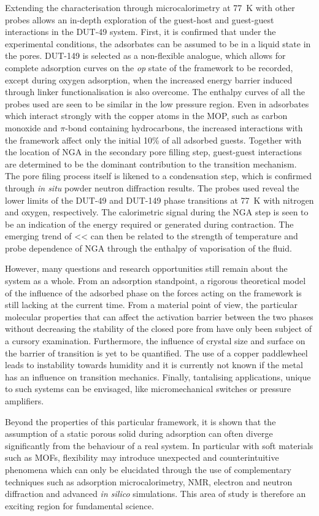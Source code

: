 Extending the characterisation through microcalorimetry at \SI{77}{\kelvin}
with other probes allows an in-depth exploration of the guest-host and 
guest-guest interactions in the DUT-49 system. First, it is confirmed 
that under the experimental conditions, the adsorbates can be assumed to 
be in a liquid state in the pores. DUT-149 is selected as a non-flexible 
analogue, which allows for complete adsorption curves on the \textit{op}
state of the framework to be recorded, except during oxygen adsorption,
when the increased energy barrier induced through linker functionalisation
is also overcome. The enthalpy curves of all the probes used are seen to 
be similar in the low pressure region. Even in adsorbates which interact 
strongly with the copper atoms in the \gls{MOP}, such as carbon 
monoxide and \(\pi\)-bond containing hydrocarbons, the 
increased interactions with the 
framework affect only the initial 10\% of all adsorbed guests. Together
with the location of \gls{NGA} in the secondary pore filling step,
guest-guest interactions are determined to be the dominant contribution 
to the transition mechanism. The pore filing process itself is likened
to a condensation step, which is confirmed through \textit{in situ}
powder neutron diffraction results.
The probes used reveal the lower limits of the DUT-49
and DUT-149 phase transitions at \SI{77}{\kelvin} with nitrogen and 
oxygen, respectively. The calorimetric signal during the \gls{NGA} step
is seen to be an indication of the energy required or generated 
during contraction. The emerging trend of <<
can then be related to the strength of temperature and probe dependence
of \gls{NGA} through the enthalpy of vaporisation of the fluid.

However, many questions and research opportunities still remain about the 
system as a whole. From an adsorption standpoint, a rigorous theoretical 
model of the influence of the adsorbed phase on the forces acting on the
framework is still lacking at the current time.
From a material point of view, the particular molecular properties that 
can affect the activation barrier between the two phases without 
decreasing the stability of the closed pore from have only been 
subject of a cursory examination.
Furthermore, the influence of crystal size and surface on the
barrier of transition is yet to be quantified. The use of a copper 
paddlewheel leads to instability towards humidity and it is currently
not known if the metal has an influence on transition mechanics.
Finally, tantalising applications, unique to such systems can be 
envisaged, like micromechanical switches or pressure amplifiers.

Beyond the properties of this particular framework, it is shown that 
the assumption of a static porous solid during adsorption can often
diverge significantly from the behaviour of a real system. In particular
with soft materials such as \glspl{MOF}, flexibility may introduce 
unexpected and counterintuitive phenomena which can only be elucidated 
through the use of complementary techniques such as 
adsorption microcalorimetry, \gls{NMR}, electron and neutron diffraction 
and advanced \textit{in silico} simulations. This area of study is therefore
an exciting region for fundamental science.

\FloatBarrier%
\pagebreak